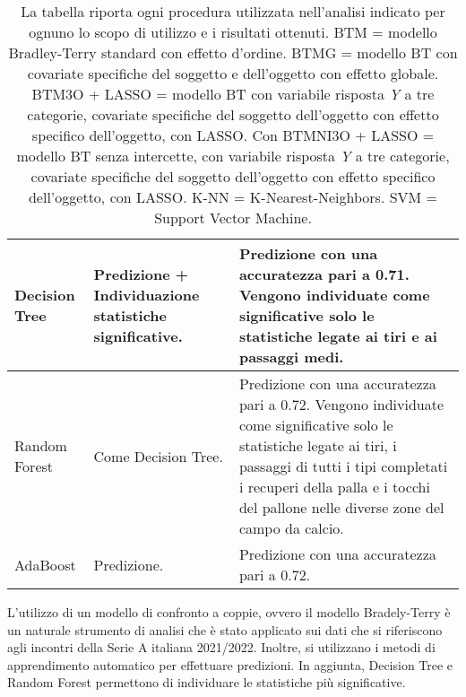 \begin{table}[]
\begin{longtable}{|C{0.18\textwidth}|C{0.3\textwidth}|C{0.5\textwidth}|}
	\hline	
	Decision Tree & Predizione + Individuazione statistiche significative. & Predizione con una accuratezza pari a 0.71. Vengono individuate come significative solo le statistiche legate ai tiri e ai passaggi medi.\\
	\hline	
	Random Forest & Come Decision Tree. & Predizione con una accuratezza pari a 0.72. Vengono individuate come significative solo le statistiche legate ai tiri, i passaggi di tutti i tipi completati i recuperi della palla e i tocchi del pallone nelle diverse zone del campo da calcio. \\
	\hline	
	AdaBoost & Predizione. & Predizione con una accuratezza pari a 0.72. \\
	\hline
\end{longtable}	
\vspace*{5mm}

\caption{La tabella riporta ogni procedura utilizzata nell'analisi indicato per ognuno lo scopo di utilizzo e i risultati ottenuti. BTM = modello Bradley-Terry standard con effetto d'ordine. BTMG = modello BT con covariate specifiche del soggetto e dell'oggetto con effetto globale. BTM3O + LASSO = modello BT con variabile risposta \emph{Y} a tre categorie, covariate specifiche del soggetto dell'oggetto con effetto specifico dell'oggetto, con LASSO. Con BTMNI3O + LASSO = modello BT senza intercette, con variabile risposta \emph{Y} a tre categorie, covariate specifiche del soggetto dell'oggetto con effetto specifico dell'oggetto, con LASSO. K-NN = K-Nearest-Neighbors. SVM = Support Vector Machine.} \label{tab:fine}

\end{table}
L'utilizzo di un modello di confronto a coppie, ovvero il modello Bradely-Terry è un naturale strumento di analisi che è stato applicato sui dati che si riferiscono agli incontri della Serie A italiana 2021/2022. 
Inoltre, si utilizzano i metodi di apprendimento automatico per effettuare predizioni. In aggiunta, Decision Tree e Random Forest permettono di individuare le statistiche più significative. \\
